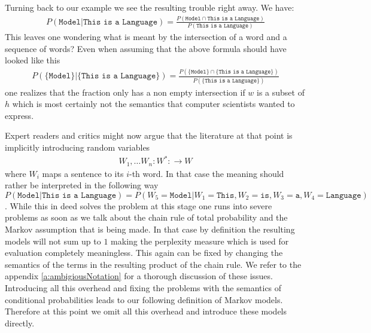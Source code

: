 \documentclass[•]{book}
\begin{document}
Turning back to our example we see the resulting trouble right away. 
We have: 
\begin{align}
P(\texttt{Model}|\texttt{This is a Language}) = \frac{P(\texttt{Model}\cap\texttt{This is a Language})}{P(\texttt{This is a Language})}
\end{align}
This leaves one wondering what is meant by the intersection of a word and a sequence of words?
Even when assuming that the above formula should have looked like this
\begin{align}
P(\{\texttt{Model}\}|\{\texttt{This is a Language}\}) = \frac{P(\{\texttt{Model}\}\cap\{\texttt{This is a Language}\})}{P(\{\texttt{This is a Language}\})}
\end{align}
one realizes that the fraction only has a non empty intersection if $w$ is a subset of $h$ which is most certainly not the semantics that computer scientists wanted to express. 
\begin{remark}
Expert readers and critics might now argue that the literature at that point is implicitly introducing random variables 
\begin{align}
W_1,\dots W_n: W^{*}: \longrightarrow W
\end{align} where $W_i$ maps a sentence to its $i$-th word. 
In that case the meaning should rather be interpreted in the following way $P(\texttt{Model}|\texttt{This is a Language}) = P(W_5 = \texttt{Model}| W_1 = \texttt{This}, W_2=\texttt{is}, W_3 = \texttt{a}, W_4= \texttt{Language})$. 
While this in deed solves the problem at this stage one runs into severe problems as soon as we talk about the chain rule of total probability and the Markov assumption that is being made.
In that case by definition the resulting models will not sum up to $1$ making the perplexity measure which is used for evaluation completely meaningless. 
This again can be fixed by changing the semantics of the terms in the resulting product of the chain rule. We refer to the appendix \ref{a:ambigiousNotation} for a thorough discussion of these issues.
Introducing all this overhead and fixing the problems with the semantics of conditional probabilities leads to our following definition of Markov models. 
Therefore at this point we omit all this overhead and introduce these models directly.
\end{remark}
\end{document}
